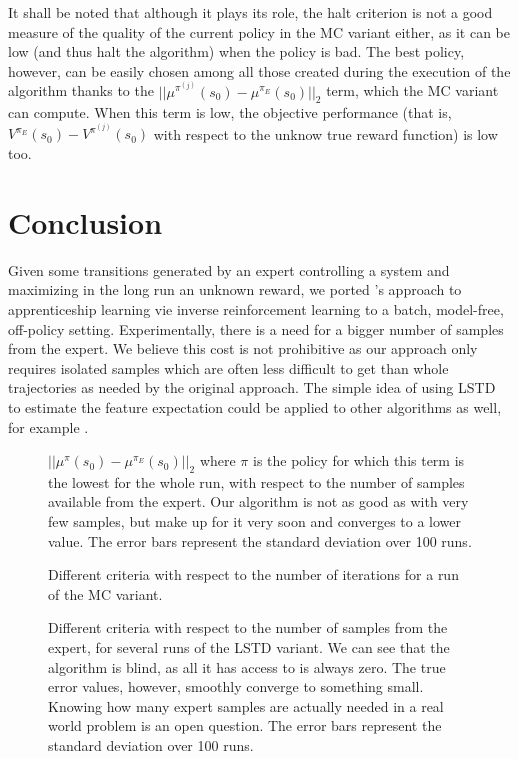 \documentclass{jfpda2011}
\begin{document}
It shall be noted that although it plays its role, the halt criterion is not a good measure of the quality of the current policy in the MC variant either, as it can be low (and thus halt the algorithm) when the policy is bad. The best policy, however, can be easily chosen among all those created during the execution of the algorithm thanks to the $||\mu^{\pi^{(j)}}(s_0) - \mu^{\pi_E}(s_0)||_2$ term, which the MC variant can compute. When this term is low, the objective performance (that is, $V^{\pi_E}(s_0)-V^{\pi^{(j)}}(s_0)$ with respect to the unknow true reward function) is low too. 
\section{Conclusion}
\label{sec:conclusion}
Given some transitions generated by an expert controlling a system and maximizing in the long run an unknown reward, we ported \citet{abbeel2004apprenticeship}'s approach to apprenticeship learning vie inverse reinforcement learning to a batch, model-free, off-policy setting. Experimentally, there is a need for a bigger number of samples from the expert. We believe this cost is not prohibitive as our approach only requires isolated samples which are often less difficult to get than whole trajectories as needed by the original approach.
The simple idea of using LSTD to estimate the feature expectation could be applied to other algorithms as well, for example \citep{abbeel2004apprenticeship,syed2008apprenticeship,syed2008game,ziebart2008maximum}.\\
\begin{figure}
\centering

\caption{$||\mu^{\pi}(s_0) - \mu^{\pi_E}(s_0)||_2$ where $\pi$ is the policy for which this term is the lowest for the whole run, with respect to the number of samples available from the expert. Our algorithm is not as good as \citet{abbeel2004apprenticeship} with very few samples, but make up for it very soon and converges to a lower value. The error bars represent the standard deviation over 100 runs.}
\label{fig:E}
\end{figure}
\begin{figure}
\centering

\caption{Different criteria with respect to the number of iterations for a run of the MC variant.}
\label{fig:A}
\end{figure}
\begin{figure}
\centering

\caption{Different criteria with respect to the number of samples from the expert, for several runs of the LSTD variant. We can see that the algorithm is blind, as all it has access to is always zero. The true error values, however, smoothly converge to something small. Knowing how many expert samples are actually needed in a real world problem is an open question. The error bars represent the standard deviation over 100 runs.}
\label{fig:B}
\end{figure}
\end{document}
